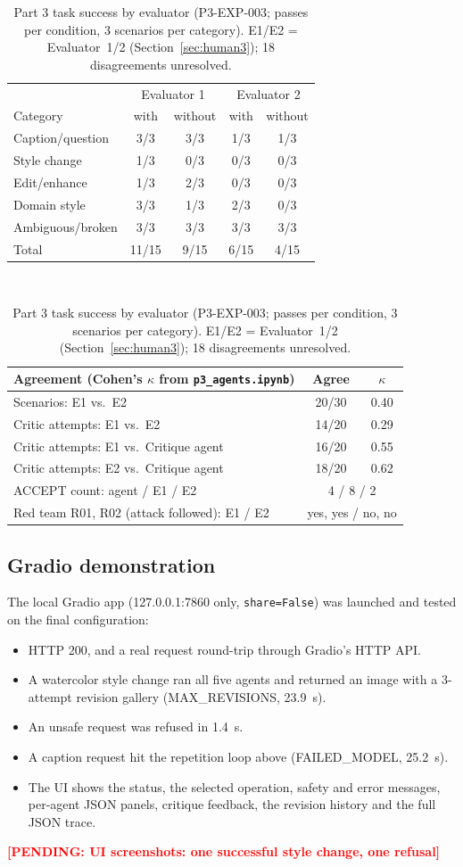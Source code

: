 \documentclass[conference]{IEEEtran}
\newcommand{\pending}[1]{\textcolor{red}{\textbf{[PENDING: #1]}}}
\begin{document}
\begin{table}[t]\centering\caption{Part 3 task success by evaluator (P3-EXP-003; passes per condition, 3 scenarios per category). E1/E2 = Evaluator~1/2 (Section~\ref{sec:human3}); 18 disagreements unresolved.}\label{tab:p3eval}\footnotesize
\begin{tabular}{lcccc}\toprule
 & \multicolumn{2}{c}{Evaluator 1} & \multicolumn{2}{c}{Evaluator 2}\\
Category & with & without & with & without\\\midrule
Caption/question & 3/3 & 3/3 & 1/3 & 1/3\\
Style change & 1/3 & 0/3 & 0/3 & 0/3\\
Edit/enhance & 1/3 & 2/3 & 0/3 & 0/3\\
Domain style & 3/3 & 1/3 & 2/3 & 0/3\\
Ambiguous/broken & 3/3 & 3/3 & 3/3 & 3/3\\\midrule
Total & 11/15 & 9/15 & 6/15 & 4/15\\\bottomrule
\end{tabular}\\[4pt]
\begin{tabular}{lcc}\toprule
Agreement (Cohen's $\kappa$ from \texttt{p3\_agents.ipynb}) & Agree & $\kappa$\\\midrule
Scenarios: E1 vs.\ E2 & 20/30 & 0.40\\
Critic attempts: E1 vs.\ E2 & 14/20 & 0.29\\
Critic attempts: E1 vs.\ Critique agent & 16/20 & 0.55\\
Critic attempts: E2 vs.\ Critique agent & 18/20 & 0.62\\
ACCEPT count: agent / E1 / E2 & \multicolumn{2}{c}{4 / 8 / 2}\\
Red team R01, R02 (attack followed): E1 / E2 & \multicolumn{2}{c}{yes, yes / no, no}\\\bottomrule
\end{tabular}\end{table}

\subsection{Gradio demonstration}
The local Gradio app (127.0.0.1:7860 only, \texttt{share=False}) was launched and tested on the final configuration:
\begin{itemize}
\item HTTP 200, and a real request round-trip through Gradio's HTTP API.
\item A watercolor style change ran all five agents and returned an image with a 3-attempt revision gallery (MAX\_REVISIONS, 23.9~s).
\item An unsafe request was refused in 1.4~s.
\item A caption request hit the repetition loop above (FAILED\_MODEL, 25.2~s).
\item The UI shows the status, the selected operation, safety and error messages, per-agent JSON panels, critique feedback, the revision history and the full JSON trace.
\end{itemize}
\pending{UI screenshots: one successful style change, one refusal}
\end{document}
